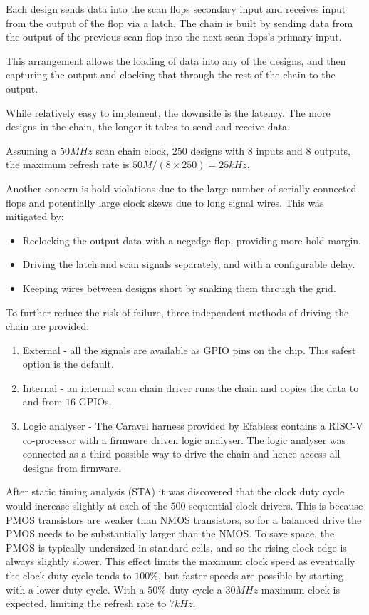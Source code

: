 Each design sends data into the scan flops secondary input and receives input from the output of the flop via a latch.
The chain is built\cite{updateiodesign} by sending data from the output of the previous scan flop into the next scan flops’s primary input.

This arrangement allows the loading of data into any of the designs, and then capturing the output and clocking that through the rest of the chain to the output.

While relatively easy to implement, the downside is the latency.
The more designs in the chain, the longer it takes to send and receive data.

Assuming a \(50 MHz\) scan chain clock, \(250\) designs with \(8\) inputs and \(8\) outputs, the maximum refresh rate is \(50M / (8 \times 250) = 25kHz\).

Another concern is hold violations due to the large number of serially connected flops and potentially large clock skews due to long signal wires.
This was mitigated by:
\begin{itemize}
\item Reclocking the output data with a negedge flop, providing more hold margin.
\item Driving the latch and scan signals separately, and with a configurable delay.
\item Keeping wires between designs short by snaking them through the grid.
\end{itemize}

To further reduce the risk of failure, three independent methods of driving the chain are provided:
\begin{enumerate}
\item External - all the signals are available as GPIO pins on the chip. This safest option is the default.
\item Internal - an internal scan chain driver runs the chain and copies the data to and from \(16\) GPIOs.
\item Logic analyser - The Caravel\cite{caravel} harness provided by Efabless contains a RISC-V co-processor with a firmware driven logic analyser. The logic analyser was connected as a third possible way to drive the chain and hence access all designs from firmware.
\end{enumerate}

After static timing analysis (STA) it was discovered that the clock duty cycle would increase slightly at each of the \(500\) sequential clock drivers.
This is because PMOS transistors are weaker than NMOS transistors, so for a balanced drive the PMOS needs to be substantially larger than the NMOS.
To save space, the PMOS is typically undersized in standard cells, and so the rising clock edge is always slightly slower. This effect limits the maximum clock speed as eventually the clock duty cycle tends to \(100\%\), but faster speeds are possible by starting with a lower duty cycle. With a \(50\%\) duty cycle a \(30 MHz\) maximum clock is expected, limiting the refresh rate to \(7 kHz\).

